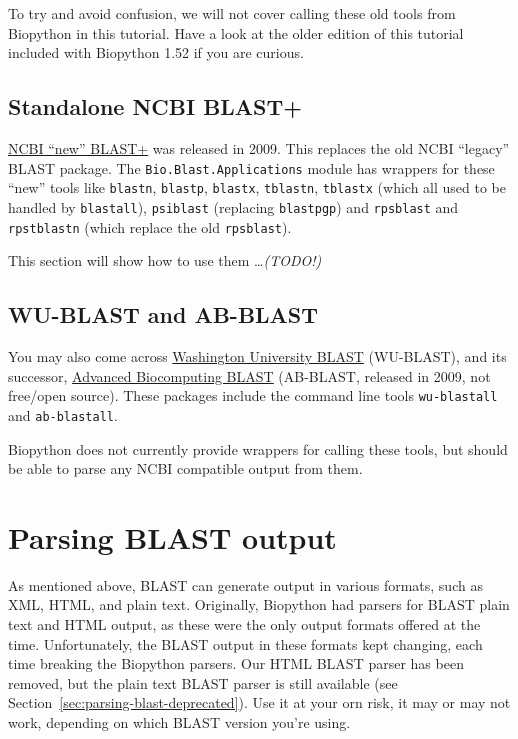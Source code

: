 \documentclass{report}
\begin{document}
To try and avoid confusion, we will not cover calling these old tools from Biopython
in this tutorial. Have a look at the older edition of this tutorial included with
Biopython 1.52 if you are curious.

\subsection{Standalone NCBI BLAST+}

\href{http://blast.ncbi.nlm.nih.gov/Blast.cgi?CMD=Web&PAGE_TYPE=BlastDocs&DOC_TYPE=Download}
{NCBI ``new'' BLAST+} was released in 2009. This replaces the old NCBI ``legacy'' BLAST
package. The \verb|Bio.Blast.Applications| module has wrappers for these ``new'' tools
like \verb|blastn|, \verb|blastp|, \verb|blastx|, \verb|tblastn|, \verb|tblastx|
(which all used to be handled by \verb|blastall|), \verb|psiblast|
(replacing \verb|blastpgp|) and \verb|rpsblast| and \verb|rpstblastn|
(which replace the old \verb|rpsblast|).

This section will show how to use them \ldots \textit{(TODO!)}

\subsection{WU-BLAST and AB-BLAST}

You may also come across \href{http://blast.wustl.edu/}{Washington University BLAST}
(WU-BLAST), and its successor, \href{http://blast.advbiocomp.com}{Advanced Biocomputing
BLAST} (AB-BLAST, released in 2009, not free/open source). These packages include
the command line tools \verb|wu-blastall| and \verb|ab-blastall|.

Biopython does not currently provide wrappers for calling these tools, but should be able
to parse any NCBI compatible output from them.

\section{Parsing BLAST output}
\label{sec:parsing-blast}

As mentioned above, BLAST can generate output in various formats, such as
XML, HTML, and plain text. Originally, Biopython had parsers for BLAST
plain text and HTML output, as these were the only output formats offered
at the time. Unfortunately, the BLAST output in these formats kept changing,
each time breaking the Biopython parsers. Our HTML BLAST parser has been
removed, but the plain text BLAST parser is still available (see
Section~\ref{sec:parsing-blast-deprecated}). Use it at your orn risk,
it may or may not work, depending on which BLAST version you're using.
\end{document}
